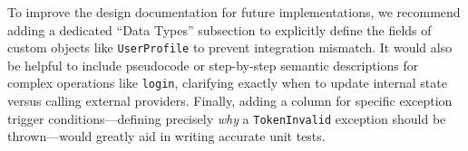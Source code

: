 \documentclass[12pt, titlepage]{article}
\begin{document}
To improve the design documentation for future implementations, we recommend adding a dedicated ``Data Types'' subsection to explicitly define the fields of custom objects like \texttt{UserProfile} to prevent integration mismatch. It would also be helpful to include pseudocode or step-by-step semantic descriptions for complex operations like \texttt{login}, clarifying exactly when to update internal state versus calling external providers. Finally, adding a column for specific exception trigger conditions---defining precisely \textit{why} a \texttt{TokenInvalid} exception should be thrown---would greatly aid in writing accurate unit tests.
\end{document}
